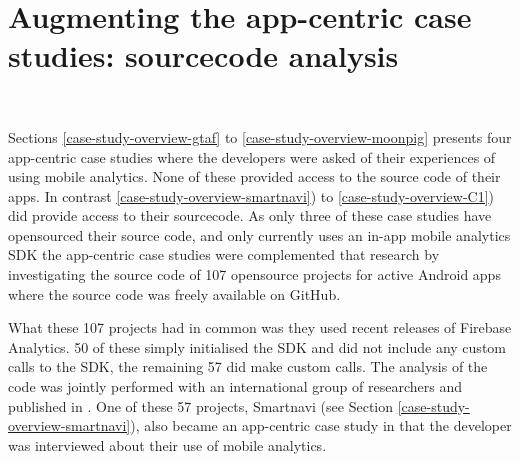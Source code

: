 \section{Augmenting the app-centric case studies: sourcecode analysis}~\label{section-sourcecode-analysis-to-augment-app-centric-case-studies}

Sections \ref{case-study-overview-gtaf} to \ref{case-study-overview-moonpig} presents four app-centric case studies where the developers were asked of their experiences of using mobile analytics. None of these provided access to the source code of their apps. In contrast \ref{case-study-overview-smartnavi}) to \ref{case-study-overview-C1}) did provide access to their sourcecode. As only three  of these case studies have opensourced their source code, and only  currently uses an in-app mobile analytics SDK the app-centric case studies were complemented that research by investigating the source code of 107 opensource projects for active Android apps where the source code was freely available on GitHub. 

What these 107 projects had in common was they used recent releases of Firebase Analytics. 50 of these simply initialised the SDK and did not include any custom calls to the SDK, the remaining 57 did make custom calls. The analysis of the code was jointly performed with an international group of researchers and published in . One of these 57 projects, Smartnavi (see Section \ref{case-study-overview-smartnavi}), also became an app-centric case study in that the developer was interviewed about their use of mobile analytics. 




